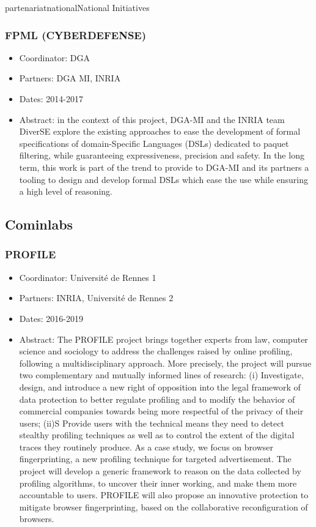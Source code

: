 \documentclass{ra2018}
\begin{document}
\begin{module}{partenariat}{national}{National Initiatives}
\subsubsection*{\label{project:fpml}FPML (CYBERDEFENSE)}

   \begin{itemize}
   	    \item Coordinator: DGA
      	\item Partners: DGA MI, INRIA
      	\item Dates: 2014-2017
      	\item Abstract: in the context of this project, DGA-MI and the INRIA team DiverSE explore the existing approaches to ease the development of formal specifications of domain-Specific Languages (DSLs) dedicated to paquet filtering, while guaranteeing expressiveness, precision and safety. In the long term, this work is part of the trend to provide to DGA-MI and its partners a tooling to design and develop formal DSLs which ease the use while ensuring a high level of reasoning.
      \end{itemize}

\subsection{Cominlabs}
\subsubsection*{\label{project:profile}PROFILE}

\begin{itemize}
	\item Coordinator: Universit\'e de Rennes 1
	\item Partners: INRIA, Universit\'e de Rennes 2
	\item Dates: 2016-2019
	\item Abstract:  The PROFILE project brings together experts from law, computer science and sociology to address the challenges raised by online profiling, following a multidisciplinary approach. More precisely, the project will pursue two complementary and mutually informed lines of research: (i) Investigate, design, and introduce a new right of opposition into the legal framework of data protection to better regulate profiling and to modify the behavior of commercial companies towards being more respectful of the privacy of their users; (ii)S Provide users with the technical means they need to detect stealthy profiling techniques as well as to control the extent of the digital traces they routinely produce. As a case study, we focus on browser fingerprinting, a new profiling technique for targeted advertisement. The project will develop a generic framework to reason on the data collected by profiling algorithms, to uncover their inner working, and make them more accountable to users. PROFILE will also propose an innovative protection to mitigate browser fingerprinting, based on the collaborative reconfiguration of browsers.
\end{itemize}

 \end{module} 
\end{document}
